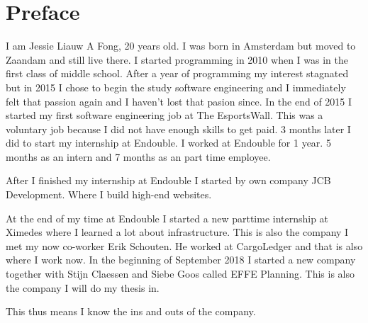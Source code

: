\chapter{Preface}
I am Jessie Liauw A Fong, 20 years old. I was born in Amsterdam but moved to Zaandam and still live there. I started programming in 2010 when I was in the first class of middle school. After a year of programming my interest stagnated but in 2015 I chose to begin the study software engineering and I immediately felt that passion again and I haven’t lost that pasion since. In the end of 2015 I started my first software engineering job at The EsportsWall. This was a voluntary job because I did not have enough skills to get paid. 3 months later I did to start my internship at Endouble. I worked at Endouble for 1 year. 5 months as an intern and 7 months as an part time employee.

After I finished my internship at Endouble I started by own company JCB Development. Where I build high-end websites.

At the end of my time at Endouble I started a new parttime internship at Ximedes where I learned a lot about infrastructure. This is also the company I met my now co-worker Erik Schouten. He worked at CargoLedger and that is also where I work now. In the beginning of September 2018 I started a new company together with Stijn Claessen and Siebe Goos called EFFE Planning. This is also the company I will do my thesis in.

This thus means I know the ins and outs of the company.
